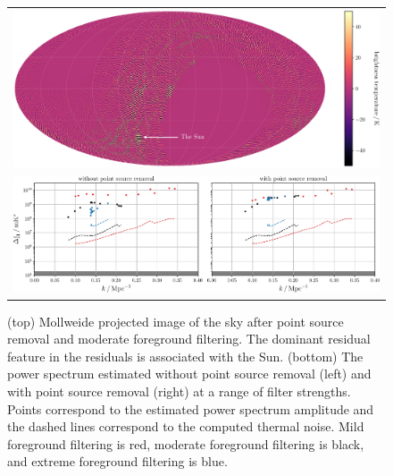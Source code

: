 \begin{bibunit}
\begin{figure}
    \begin{tabular}{c}
        \includegraphics[width=\textwidth]{figures/chapter4/filtered-sky-map-colorbar}\\
        \includegraphics[width=\textwidth]{figures/chapter4/spherical-power-spectrum-filter-strength}\\
    \end{tabular}
    \caption{
        (top) Mollweide projected image of the sky after point source removal and moderate
        foreground filtering. The dominant residual feature in the residuals is associated with the
        Sun.
        (bottom) The power spectrum estimated without point source removal (left) and with point
        source removal (right) at a range of filter strengths. Points correspond to the estimated
        power spectrum amplitude and the dashed lines correspond to the computed thermal noise.
        Mild foreground filtering is red, moderate foreground filtering is black, and extreme
        foreground filtering is blue.
    }
    \label{fig:spherical-power-spectra-filter-strength}
\end{figure}


\end{bibunit}
